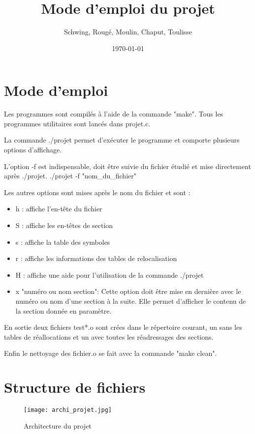 \documentclass[12pt, a4paper]{article}
\title{Mode d'emploi du projet}
\author{Schwing, Roug\'e, Moulin, Chaput, Toulisse}
\date{\today}
\begin{document}
\maketitle

\section{Mode d'emploi}

Les programmes sont compilés à l'aide de la commande "make".
Tous les programmes utilitaires sont lancés dans projet.c.


La commande ./projet permet d'exécuter le programme et comporte plusieurs options d'affichage.


L'option -f est indispensable, doit être suivie du fichier étudié et mise directement après ./projet.	
./projet -f "nom\_du\_fichier"


Les autres options sont mises après le nom du fichier et sont :
\begin{itemize}


		 \item h : affiche l'en-tête du fichier
		 \item S : affiche les en-têtes de section
		 \item s : affiche la table des symboles
		 \item r : affiche les informations des tables de relocalisation
		 \item H : affiche une aide pour l'utilisation de la commande ./projet
		 \item x "numéro ou nom section": Cette option doit être mise en dernière avec le numéro ou nom d'une section à la suite.
					Elle permet d'afficher le contenu de la section donnée en paramètre.

\end{itemize}

En sortie deux fichiers test*.o sont crées dans le répertoire courant, un sans les tables de réallocations et un avec toutes les réadressages des sections.

Enfin le nettoyage des fichier.o se fait avec la commande "make clean".

\section{Structure de fichiers}
\begin{figure}[!h]
    \begin{center}
        \texttt{[image: archi\_projet.jpg]}
        \caption{Architecture du projet}
    \end{center}
\end{figure}
\end{document}
